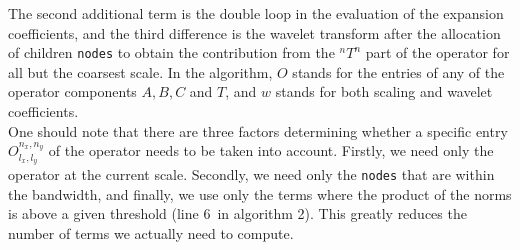 \noindent
The second additional term is the
double loop in the evaluation of the expansion coefficients, and the third
difference is the wavelet transform after the allocation of children 
\texttt{nodes} to obtain the contribution from the $^nT^n$ part of the operator
for all but the coarsest scale. In the algorithm, $O$ stands for the entries
of any of the operator components $A, B, C$ and $T$, and $w$ stands for both 
scaling and wavelet coefficients.\\

\noindent
One should note that there are three factors determining whether a specific
entry $O^{n_x,n_y}_{l_x,l_y}$ of the operator needs to be taken into
account. Firstly, we need only the operator at the current scale. Secondly, we
need only the \texttt{nodes} that are within the bandwidth, and finally, we use
only the terms where the product of the norms is above a given threshold 
(line 6\ in algorithm 2). This greatly reduces the number of terms we actually 
need to compute.


